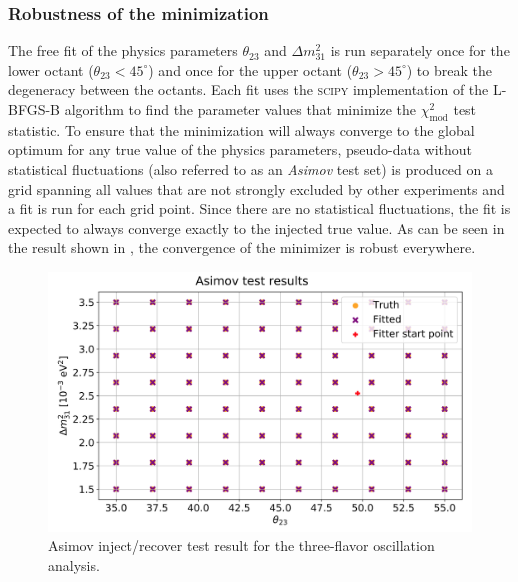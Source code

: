 \subsubsection{Robustness of the minimization}
The free fit of the physics parameters $\theta_{23}$ and $\Delta m^2_{31}$ is run separately once for the lower octant ($\theta_{23} < 45^\circ$) and once for the upper octant ($\theta_{23} > 45^\circ$) to break the degeneracy between the octants. Each fit uses the \textsc{scipy}\cite{2020SciPy-NMeth} implementation of the \textsc{L-BFGS-B} algorithm\cite{l-bfgs-b} to find the parameter values that minimize the $\chi^2_{\mathrm{mod}}$ test statistic. To ensure that the minimization will always converge to the global optimum for any true value of the physics parameters, pseudo-data without statistical fluctuations (also referred to as an \emph{Asimov} test set) is produced on a grid spanning all values that are not strongly excluded by other experiments and a fit is run for each grid point. Since there are no statistical fluctuations, the fit is expected to always converge exactly to the injected true value. As can be seen in the result shown in , the convergence of the minimizer is robust everywhere. 
\begin{figure}
    \centering
    \includegraphics[width=0.9\linewidth]{figures/measurement/three_flavor/asimov_test/inject_recover_map.png}
    \caption{Asimov inject/recover test result for the three-flavor oscillation analysis.}
    \label{fig:three-flavor-asimov}
\end{figure}

